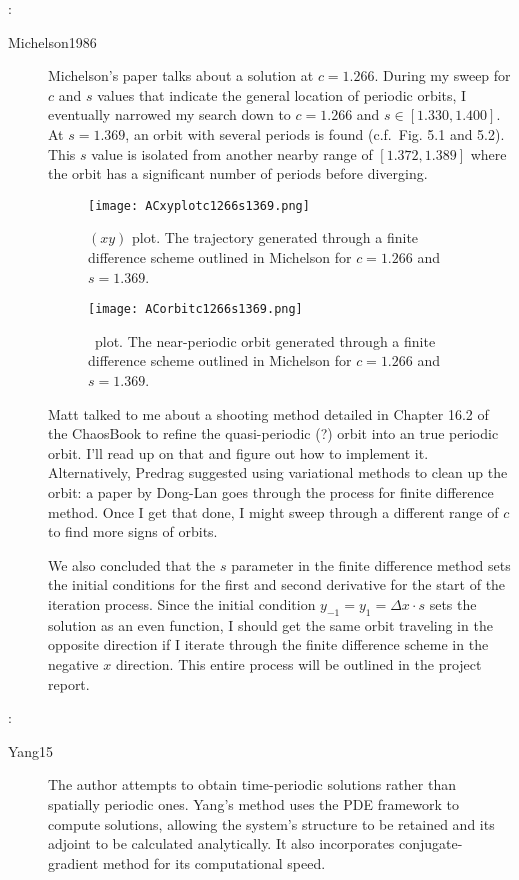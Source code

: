 \begin{description}
{\begin{description}
\end{description}
}

{ :
\begin{description}
\item[Michelson1986]
Michelson's paper talks about a solution at $c=1.266$. During my sweep for $c$ and $s$ values
that indicate the general location of periodic orbits, I eventually narrowed my search down to
$c=1.266$ and $s \in [1.330,1.400]$. At $s=1.369$, an orbit with several periods is found
(c.f.\ Fig. 5.1 and 5.2). This $s$ value is isolated from another nearby range of $[1.372,1.389]$
where the orbit has a significant number of periods before diverging.

\begin{figure}[h!]
  \centering
  \texttt{[image: ACxyplotc1266s1369.png]}
  \caption{
$(xy)$ plot. The trajectory generated through a finite difference scheme
outlined in Michelson for $c=1.266$ and $s=1.369$.}

  \texttt{[image: ACorbitc1266s1369.png]}
  \caption{\Statesp\ plot. The near-periodic orbit generated through a finite difference
  scheme outlined in Michelson for $c=1.266$ and $s=1.369$.}
\end{figure}

Matt talked to me about a shooting method detailed in Chapter 16.2 of the ChaosBook to refine the
quasi-periodic (?) orbit into an true periodic orbit. I'll read up on that and figure out how to
implement it. Alternatively, Predrag suggested using variational methods to clean up the orbit: a
paper by Dong-Lan goes through the process for finite difference method. Once I get that done, I
might sweep through a different range of $c$ to find more signs of orbits.

We also concluded that the $s$ parameter in the finite difference method
sets the initial conditions for the first and second derivative for the start of the iteration
process. Since the initial condition $y_{-1} = y_{1} = \Delta x \cdot s$ sets the solution as an
even function, I should get the same orbit traveling in the opposite direction if I iterate through
the finite difference scheme in the negative $x$ direction. This entire process will be outlined in
the project report.

\end{description}
}

{ :
\begin{description}
\item[Yang15]
The author attempts to obtain time-periodic solutions rather than spatially periodic
ones. Yang's method uses the PDE framework to compute solutions, allowing the system's
structure to be retained and its adjoint to be calculated analytically. It also incorporates
conjugate-gradient method for its computational speed.


\end{description}}
\end{description}

